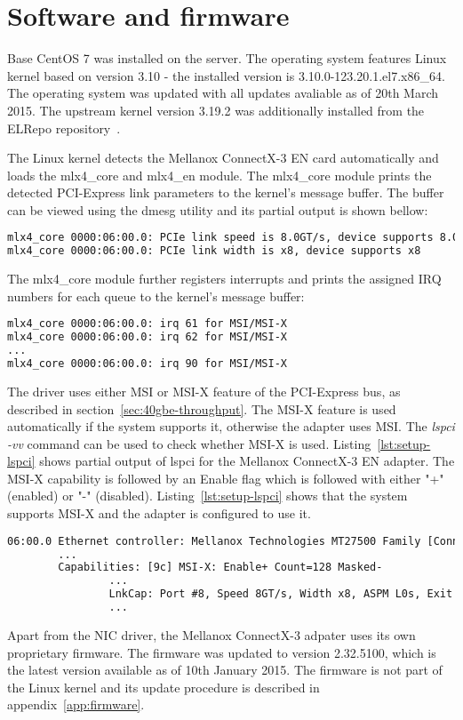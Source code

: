 
\section{Software and firmware}
Base CentOS 7 was installed on the server.
The operating system features Linux kernel based on version 3.10 -
the installed version is 3.10.0-123.20.1.el7.x86\_64.
The operating system was updated with all updates avaliable as of 20th March 2015.
The upstream kernel version 3.19.2 was additionally installed from the ELRepo repository~\cite{elrepo-kernel-ml}.

The Linux kernel detects the Mellanox ConnectX-3 EN card automatically and loads the mlx4\_core and mlx4\_en module.
The mlx4\_core module prints the detected PCI-Express link parameters to the kernel's message buffer.
The buffer can be viewed using the dmesg utility and its partial output is shown bellow:
\begin{lstlisting}[language=TeX]
mlx4_core 0000:06:00.0: PCIe link speed is 8.0GT/s, device supports 8.0GT/s
mlx4_core 0000:06:00.0: PCIe link width is x8, device supports x8
\end{lstlisting}
The mlx4\_core module further registers interrupts and prints the assigned IRQ numbers for each queue
to the kernel's message buffer:
\begin{lstlisting}[language=TeX]
mlx4_core 0000:06:00.0: irq 61 for MSI/MSI-X
mlx4_core 0000:06:00.0: irq 62 for MSI/MSI-X
...
mlx4_core 0000:06:00.0: irq 90 for MSI/MSI-X
\end{lstlisting}

The driver uses either MSI or MSI-X feature of the PCI-Express bus, as described in section~\ref{sec:40gbe-throughput}.
The MSI-X feature is used automatically if the system supports it, otherwise the adapter uses MSI.
The {\it{lspci -vv}} command can be used to check whether MSI-X is used.
Listing~\ref{lst:setup-lspci} shows partial output of lspci for the Mellanox ConnectX-3 EN adapter.
The MSI-X capability is followed by an Enable flag which is followed with either "+" (enabled)
or "-" (disabled).
Listing~\ref{lst:setup-lspci} shows that the system supports MSI-X and the adapter is configured to use it.
\begin{lstlisting}[language=TeX,label={lst:setup-lspci},caption={Partial output of lspci -vv for Mellanox ConnectX-3 EN}]
06:00.0 Ethernet controller: Mellanox Technologies MT27500 Family [ConnectX-3]
		...
		Capabilities: [9c] MSI-X: Enable+ Count=128 Masked-
				...
				LnkCap: Port #8, Speed 8GT/s, Width x8, ASPM L0s, Exit Latency L0s unlimited, L1 unlimited
				...
\end{lstlisting}

Apart from the NIC driver, the Mellanox ConnectX-3 adpater uses its own proprietary firmware.
The firmware was updated to version 2.32.5100, which is the latest version available as of 10th January 2015.
The firmware is not part of the Linux kernel and its update procedure is described in appendix~\ref{app:firmware}.
